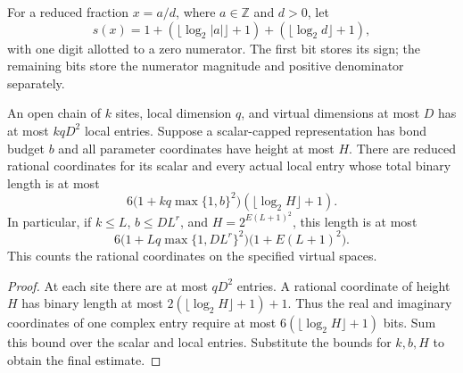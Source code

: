 \begin{definition}
    \label{def:lvv_rational_coordinate_storage}
    \leanok
    For a reduced fraction $x=a/d$, where $a\in\mathbb Z$ and $d>0$,
    let
    \[
        s(x)=1+(\lfloor\log_2|a|\rfloor+1)
        +(\lfloor\log_2 d\rfloor+1),
    \]
    with one digit allotted to a zero numerator. The first bit stores
    its sign; the remaining bits store the numerator magnitude and
    positive denominator separately.
\end{definition}

\begin{lemma}
    \label{lem:lvv_rational_tensor_storage}
    \leanok
    An open chain of $k$ sites, local dimension $q$, and virtual dimensions
    at most $D$ has at most $kqD^2$ local entries. Suppose a scalar-capped
    representation has bond budget $b$ and all parameter coordinates
    have height at most $H$. There are reduced rational coordinates for
    its scalar and every actual local entry whose total binary length is
    at most
    \[
        6\bigl(1+kq\max\{1,b\}^2\bigr)(\lfloor\log_2 H\rfloor+1).
    \]
    In particular, if $k\le L$, $b\le DL^r$, and
    $H=2^{E(L+1)^2}$, this length is at most
    \[
        6\bigl(1+Lq\max\{1,DL^r\}^2\bigr)\bigl(1+E(L+1)^2\bigr).
    \]
    This counts the rational coordinates on the specified virtual spaces.
\end{lemma}
\begin{proof}\leanok
    At each site there are at most $qD^2$ entries. A rational coordinate
    of height $H$ has binary length at most
    $2(\lfloor\log_2H\rfloor+1)+1$. Thus the real and imaginary
    coordinates of one complex entry require at most
    $6(\lfloor\log_2H\rfloor+1)$ bits. Sum this bound over the scalar
    and local entries. Substitute the bounds for $k,b,H$ to obtain the
    final estimate.
\end{proof}

